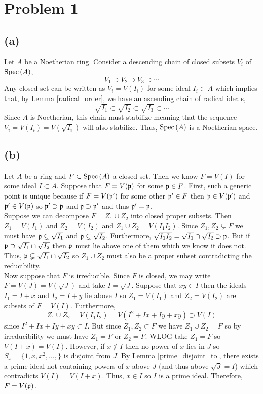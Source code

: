 \documentclass[12pt]{extarticle}
\begin{document}
 
\section*{Problem 1}

\subsection*{(a)}

Let $A$ be a Noetherian ring. Consider a descending chain of closed subsets $V_i$ of $\mathrm{Spec}\left( A \right)$,
\[ V_1 \supset V_2 \supset V_3 \supset \cdots \]
Any closed set can be written as $V_i = V(I_i)$ for some ideal $I_i \subset A$ which implies that, by Lemma \ref{radical_order}, we have an ascending chain of radical ideals,
\[ \sqrt{I_1} \subset \sqrt{I_2} \subset \sqrt{I_3} \subset \cdots \]
Since $A$ is Noetherian, this chain must stabilize meaning that the sequence $V_i = V(I_i) = V(\sqrt{I_i})$ will also stabilize. Thus, $\mathrm{Spec}\left( A \right)$ is a Noetherian space. 

\subsection*{(b)}

Let $A$ be a ring and $F \subset \mathrm{Spec}\left( A \right)$ a closed set. Then we know $F = V(I)$ for some ideal $I \subset A$. Suppose that $F = V(\mathfrak{p})$ for some $\mathfrak{p} \in F$. First, such a generic point is unique because if $F = V(\mathfrak{p}')$ for some other $\mathfrak{p}' \in F$ then $\mathfrak{p} \in V(\mathfrak{p}')$ and $\mathfrak{p}' \in V(\mathfrak{p})$ so $\mathfrak{p}' \supset \mathfrak{p}$ and $\mathfrak{p} \supset \mathfrak{p}'$ and thus $\mathfrak{p}' = \mathfrak{p}$. 
\bigskip\\
Suppose we can decompose $F = Z_1 \cup Z_2$ into closed proper subsets. Then $Z_1 = V(I_1)$ and $Z_2 = V(I_2)$ and $Z_1 \cup Z_2 = V(I_1 I_2)$. Since $Z_1, Z_2 \subsetneq F$ we must have $\mathfrak{p} \subsetneq \sqrt{I_1}$ and $\mathfrak{p} \subsetneq \sqrt{I_2}$. Furthermore, $\sqrt{I_1 I_2} = \sqrt{I_1} \cap \sqrt{I_2} \supset \mathfrak{p}$. But if $\mathfrak{p} \supset \sqrt{I_1} \cap \sqrt{I_2}$ then $\mathfrak{p}$ must lie above one of them which we know it does not. Thus, $\mathfrak{p} \subsetneq \sqrt{I_1} \cap \sqrt{I_2}$ so $Z_1 \cup Z_2$ must also be a proper subset contradicting the reducibility.
\bigskip\\
Now suppose that $F$ is irreducible. Since $F$ is closed, we may write $F = V(J) = V(\sqrt{J})$ and take $I = \sqrt{J}$. Suppose that $xy \in I$ then the ideals $I_1 = I + x$ and $I_2 = I + y$ lie above $I$ so $Z_1 = V(I_1)$ and $Z_2 = V(I_2)$ are subsets of $F = V(I)$. Furthermore, 
\[ Z_1 \cup Z_2 = V(I_1 I_2) = V(I^2 + Ix + I y + xy) \supset V(I) \]
since $I^2 + Ix + I y + x y \subset I$. But since $Z_1, Z_2 \subset F$ we have $Z_1 \cup Z_2 = F$ so by irreducibility we must have $Z_1 = F$ or $Z_2 = F$. WLOG take $Z_1 = F$ so $V(I + x) = V(I)$. However, if $x \notin I$ then no power of $x$ lies in $J$ so $S_x = \{1, x, x^2, \dots, \}$ is disjoint from $J$. By Lemma \ref{prime_disjoint_to}, there exists a prime ideal not containing powers of $x$ above $J$ (and thus above $\sqrt{J} = I$) which contradicts $V(I) = V(I + x)$. Thus, $x \in I$ so $I$ is a prime ideal. Therefore, $F = V(\mathfrak{p})$. 
\end{document}
